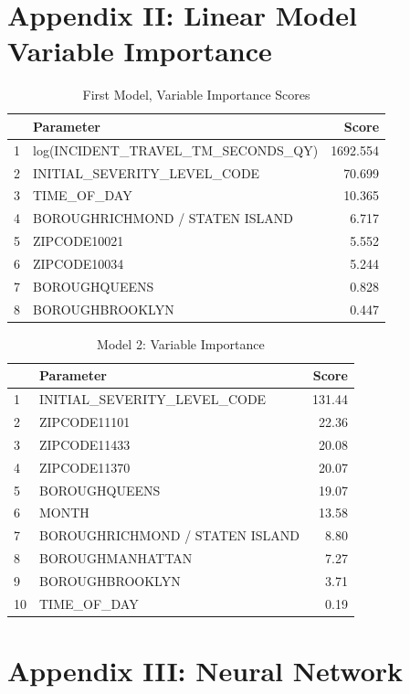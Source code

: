 \documentclass[twoside,11pt]{article}
\begin{document}
\section*{Appendix II: Linear Model Variable Importance}

\begin{table}[H]
\centering
\begin{tabular}{rlr}
  \hline
 & Parameter & Score \\ 
  \hline
1 & log(INCIDENT\_TRAVEL\_TM\_SECONDS\_QY) & 1692.554 \\ 
  2 & INITIAL\_SEVERITY\_LEVEL\_CODE & 70.699 \\ 
  3 & TIME\_OF\_DAY & 10.365 \\ 
  4 & BOROUGHRICHMOND / STATEN ISLAND & 6.717 \\ 
  5 & ZIPCODE10021 & 5.552 \\ 
  6 & ZIPCODE10034 & 5.244 \\ 
  7 & BOROUGHQUEENS & 0.828 \\ 
  8 & BOROUGHBROOKLYN & 0.447 \\ 
   \hline
\end{tabular}
\caption{First Model, Variable Importance Scores} 
\end{table}

\begin{table}[H]
\centering
\begin{tabular}{llr}
  \hline
 & Parameter & Score \\ 
  \hline
1 & INITIAL\_SEVERITY\_LEVEL\_CODE & 131.44 \\ 
  2 & ZIPCODE11101 & 22.36 \\ 
  3 & ZIPCODE11433 & 20.08 \\ 
  4 & ZIPCODE11370 & 20.07 \\ 
  5 & BOROUGHQUEENS & 19.07 \\ 
  6 & MONTH & 13.58 \\ 
  7 & BOROUGHRICHMOND / STATEN ISLAND & 8.80 \\ 
  8 & BOROUGHMANHATTAN & 7.27 \\ 
  9 & BOROUGHBROOKLYN & 3.71 \\ 
  10 & TIME\_OF\_DAY & 0.19 \\ 
   \hline
\end{tabular}
\caption{Model 2: Variable Importance} 
\end{table}


\newpage

\section*{Appendix III: Neural Network}
\end{document}
